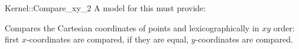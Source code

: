 \begin{ccRefFunctionObjectConcept}{Kernel::Compare_xy_2}
A model for this must provide:


      {Compares the Cartesian coordinates of points  and
        lexicographically in $xy$ order: first 
       $x$-coordinates are compared, if they are equal, $y$-coordinates
       are compared.}

\end{ccRefFunctionObjectConcept}
